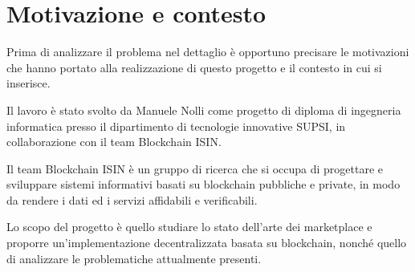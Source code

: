 \chapter{Motivazione e contesto}
Prima di analizzare il problema nel dettaglio è opportuno precisare le motivazioni che hanno portato alla realizzazione di questo progetto e il contesto in cui si inserisce.

Il lavoro è stato svolto da Manuele Nolli come progetto di diploma di ingegneria informatica presso il dipartimento di tecnologie innovative SUPSI, in collaborazione con il team Blockchain ISIN.

Il team Blockchain ISIN è un gruppo di ricerca che si occupa di progettare e sviluppare sistemi informativi basati su blockchain pubbliche e private, in modo da rendere i dati ed i servizi affidabili e verificabili.

Lo scopo del progetto è quello studiare lo stato dell'arte dei marketplace e proporre un'implementazione decentralizzata basata su blockchain, nonché quello di analizzare le problematiche attualmente presenti.